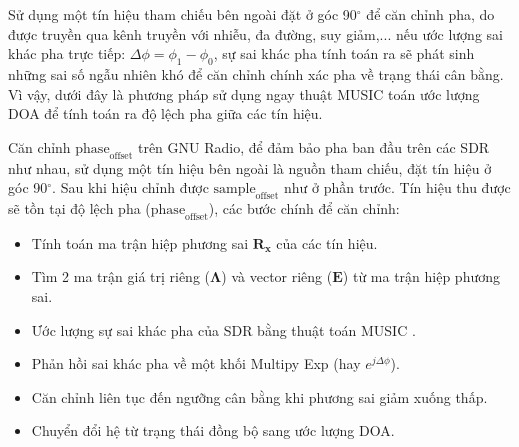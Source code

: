 
Sử dụng một tín hiệu tham chiếu bên ngoài đặt ở góc 90$^{\circ}$ để căn chỉnh pha, do được truyền qua kênh truyền với nhiễu, đa đường, suy giảm,... nếu ước lượng sai khác pha trực tiếp: $\Delta \phi = \phi_1 - \phi_0$, sự sai khác pha tính toán ra sẽ phát sinh những sai số ngẫu nhiên khó để căn chỉnh chính xác pha về trạng thái cân bằng. Vì vậy, dưới đây là phương pháp sử dụng ngay thuật MUSIC toán ước lượng DOA để tính toán ra độ lệch pha giữa các tín hiệu.

Căn chỉnh $\textrm{phase}_\textrm{offset}$ trên GNU Radio, để đảm bảo pha ban đầu trên các SDR như nhau, sử dụng một tín hiệu bên ngoài là nguồn tham chiếu, đặt tín hiệu ở góc 90$^{\circ}$. Sau khi hiệu chỉnh được $\textrm{sample}_\textrm{offset}$ như ở  phần trước. Tín hiệu thu được sẽ tồn tại độ lệch pha ($\textrm{phase}_\textrm{offset}$), các bước chính để căn chỉnh:
\begin{itemize}
	\item Tính toán ma trận hiệp phương sai $\mathbf{R}_\mathbf{x}$ của các tín hiệu.
	\item Tìm 2 ma trận giá trị riêng ($\mathbf{\Lambda}$) và vector riêng ($\mathbf{E}$) từ ma trận hiệp phương sai.
	\item Ước lượng sự sai khác pha của SDR bằng thuật toán MUSIC \cite{Whiting2018}.
	\item Phản hồi sai khác pha về một khối Multipy Exp (hay $e^{j\Delta\phi}$).
	\item Căn chỉnh liên tục đến ngưỡng cân bằng khi phương sai giảm xuống thấp.
	\item Chuyển đổi hệ từ trạng thái đồng bộ sang ước lượng DOA.
\end{itemize}

